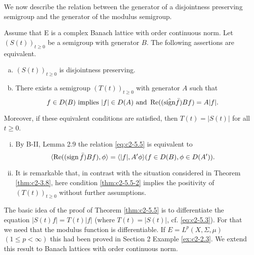 We now describe the relation between the generator of a disjointness preserving semigroup and the generator of the modulus semigroup.

\begin{theorem}\label{thm:c2-5.5}
Assume that E is a complex Banach lattice with order continuous norm. 
Let $(S(t))_{t \geq 0}$ be a semigroup with generator $B$.
The following assertions are equivalent.
\begin{enumerate}[(a)]
\item \label{thm:c2-5.5-1}
$(S(t))_{t \geq 0}$ is disjointness preserving.
\item \label{thm:c2-5.5-2}
There exists a semigroup $(T(t))_{t \geq 0}$ with generator $A$ such
that
\begin{equation}\label{eq:c2-5.5}
f \in D(B) \text{ implies } |f| \in D(A) \text{ and } \mathop{}\!\mathrm{Re}((\hat{\operatorname{sign}}  \bar{f})Bf) = A|f|.
\end{equation}
\end{enumerate}
Moreover, if these equivalent conditions are satisfied, then
$T(t) = |S(t)|$ for all $t \geq 0$.
\end{theorem}

\begin{remark*}
\begin{enumerate}[i), wide, labelsep=1em, itemindent=\parindent] \label{enum:c2-kgk.1}
\item  \label{enum:c2-kgk.1-1} %
By B-II, Lemma 2.9 
the relation \eqref{eq:c2-5.5} is equivalent to
\[
\langle\mathop{}\!\mathrm{Re}((\operatorname{sign}  \bar{f})Bf),\phi \rangle = \langle|f|,A'\phi\rangle  (f \in D(B), \phi \in D(A')).
\]
\item \label{enum:c2-kgk.1-2}
It is remarkable that, in contrast with the situation considered in
Theorem \ref{thm:c2-3.8}, here condition \ref{thm:c2-5.5-2}  implies the positivity of $(T(t))_{t \geq 0}$
without further assumptions.
\end{enumerate}
\end{remark*}

The basic idea of the proof of Theorem \ref{thm:c2-5.5}   is to differentiate the equation $|S(t)f| = T(t)|f|$ (where $T(t) = |S(t)|$, cf. \eqref{eq:c2-5.3}). For
that we need that the modulus function is differentiable.
If $E = L^{p}(X,\Sigma,\mu)$ $(1 \leq p < \infty)$ this had been proved in Section 2 Example 
\ref{ex:c2-2.3}.
We extend this result to Banach lattices with order continuous norm.

